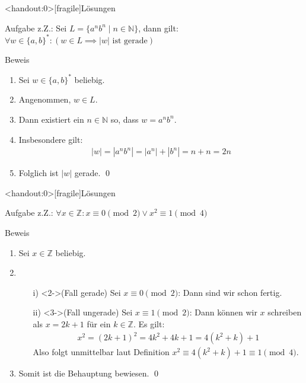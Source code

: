 {
\begin{frame}<handout:0>[fragile]{Lösungen}
	\begin{alertblock}{Aufgabe}
		z.Z.: Sei $L = \{a^nb^n \mid n \in \mathbb{N}\}$, dann gilt:\\
		$\forall w \in \{a, b\}^*: \left(w \in L \implies |w| \text{ ist gerade}\right)$
	\end{alertblock}
	\begin{alertblock}{Beweis}
		\begin{enumerate}
			\item<1-> Sei $w \in \{a,b\}^*$ beliebig.\\
			\item<2-> Angenommen,  $w \in L$.\\
			\item<3-> Dann existiert ein $n \in \mathbb{N}$ so, dass $w = a^nb^n$.\\
			\item<4-> Insbesondere gilt:
			      \begin{align*}
				      |w| = |a^nb^n| = |a^n| + |b^n| = n+n = 2n
			      \end{align*}
			\item<5-> Folglich ist $|w|$ gerade. \qed
		\end{enumerate}
	\end{alertblock}
\end{frame}
}

{
\begin{frame}<handout:0>[fragile]{Lösungen}
	\begin{alertblock}{Aufgabe}
		z.Z.: $\forall x \in \mathbb{Z}: x \equiv 0 \pmod{2} \vee x^2 \equiv 1 \pmod{4}$
	\end{alertblock}
	\begin{alertblock}{Beweis}
		\begin{enumerate}
			\item<1-> Sei $x \in \mathbb{Z}$ beliebig.
			\item<2->
			      \begin{enumerate}
				      \item[i)]<2->(Fall gerade)\phantom{un} Sei $x \equiv 0 \pmod{2}$: Dann sind wir schon fertig.
				      \item[ii)]<3->(Fall ungerade) Sei $x \equiv 1 \pmod{2}$: Dann können wir $x$ schreiben als $x = 2k + 1$ für ein $k \in \mathbb{Z}$.
				            Es gilt:
				            \begin{align*}
					            x^2 = (2k+1)^2 = 4k^2 + 4k + 1 = 4(k^2 + k) + 1
				            \end{align*}
				            Also folgt unmittelbar laut Definition $x^2 \equiv 4(k^2 + k) + 1 \equiv 1 \pmod{4}$.
			      \end{enumerate}
			\item<4-> Somit ist die Behauptung bewiesen. \qed
		\end{enumerate}
	\end{alertblock}
\end{frame}
}